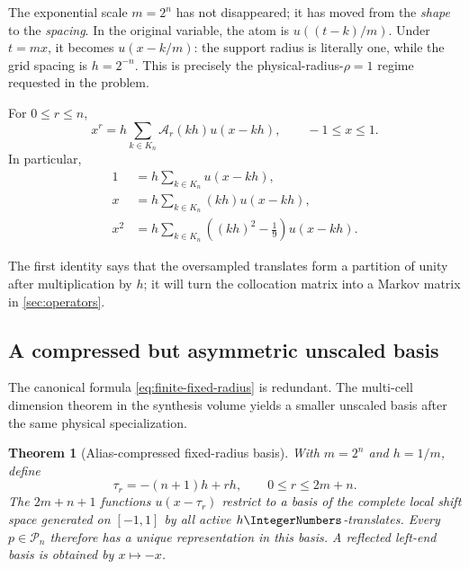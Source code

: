 \documentclass[11pt,oneside]{article}
\numberwithin{equation}{section}
\newtheorem{theorem}{Theorem}[section]
\theoremstyle{definition}
\theoremstyle{remark}
\newcommand{\PiN}{\mathcal P}
\begin{document}
\begin{remark}
The exponential scale $m=2^n$ has not disappeared; it has moved from the
\emph{shape} to the \emph{spacing}.  In the original variable, the atom is
$u((t-k)/m)$.  Under $t=mx$, it becomes $u(x-k/m)$: the support radius is
literally one, while the grid spacing is $h=2^{-n}$.  This is precisely the
physical-radius-$\rho=1$ regime requested in the problem.
\end{remark}

\begin{corollary}
\label{cor:monomial}
For $0\le r\le n$,
\begin{equation}
 x^r=h\sum_{k\in K_n}\mathcal A_r(kh)u(x-kh),
 \qquad -1\le x\le1.
 \label{eq:monomial-reproduction}
\end{equation}
In particular,
\begin{align}
 1&=h\sum_{k\in K_n}u(x-kh),
 \label{eq:partition-unity}\\
 x&=h\sum_{k\in K_n}(kh)u(x-kh),
 \label{eq:first-moment}\\
 x^2&=h\sum_{k\in K_n}\left((kh)^2-\frac19\right)u(x-kh).
 \label{eq:second-moment}
\end{align}
\end{corollary}

The first identity says that the oversampled translates form a partition of
unity after multiplication by $h$; it will turn the collocation matrix into a
Markov matrix in \cref{sec:operators}.

\subsection{A compressed but asymmetric unscaled basis}

The canonical formula \eqref{eq:finite-fixed-radius} is redundant.  The
multi-cell dimension theorem in the synthesis volume yields a smaller
unscaled basis after the same physical specialization.

\begin{theorem}[Alias-compressed fixed-radius basis]
\label{thm:compressed-basis}
With $m=2^n$ and $h=1/m$, define
\begin{equation}
 \tau_r=-(n+1)h+rh,
 \qquad 0\le r\le2m+n.
 \label{eq:compressed-centers}
\end{equation}
The $2m+n+1$ functions $u(x-\tau_r)$ restrict to a basis of the complete
local shift space generated on $[-1,1]$ by all active $h\IntegerNumbers$-translates.
Every $p\in\PiN_n$ therefore has a unique representation in this basis.  A
reflected left-end basis is obtained by $x\mapsto-x$.
\end{theorem}
\end{document}
